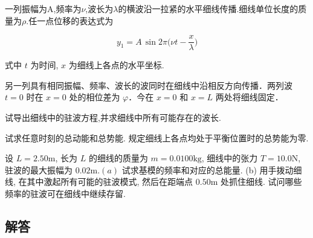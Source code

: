 \documentclass[UTF8,fontset=fandol,a4paper,11pt]{ctexart}
\newcommand{\tagline}[1]{\noindent{\small\color{muted}#1}\par}
\newcommand{\figcaption}[1]{\par\vspace{2pt}{\small\color{muted}#1}\par}
\begin{document}
\tagline{M-07-41}

一列振幅为A,频率为\(\nu\),波长为\(\lambda\)的横波沿一拉紧的水平细线传播.细线单位长度的质量为\(\rho\).任一点位移的表达式为

\[
y_{ 1 } = A \, \sin 2 \pi \biggl ( \nu t - \frac{ x } { \lambda } \biggr )
\]

式中 \(t\) 为时间, \(x\) 为细线上各点的水平坐标.

另一列具有相同振幅、频率、波长的波同时在细线中沿相反方向传播．两列波
\(t=0\) 时在 \(x=0\) 处的相位差为 \(\varphi\)．今在 \(x=0\) 和 \(x=L\)
两处将细线固定．

试导出细线中的驻波方程,并求细线中所有可能存在的波长.

试求任意时刻的总动能和总势能.
规定细线上各点均处于平衡位置时的总势能为零.

设 \(L=2.50 \mathrm{m}\), 长为 \(L\) 的细线的质量为
\(m=0.0100 \mathrm{kg}\), 细线中的张力 \(T=10.0 \mathrm{N}\),
驻波的最大振幅为 \(0.02 \mathrm{m} .(a)\) 试求基模的频率和对应的总能量.
(b) 用手拨动细线, 在其中激起所有可能的驻波模式, 然后在距端点
\(0.50 \mathrm{m}\) 处抓住细线. 试问哪些频率的驻波可在细线中继续存留.

\begin{center}\begin{minipage}{\linewidth}\centering{}\figcaption{图 7.41}\end{minipage}\end{center}

\subsection*{解答}
\end{document}
